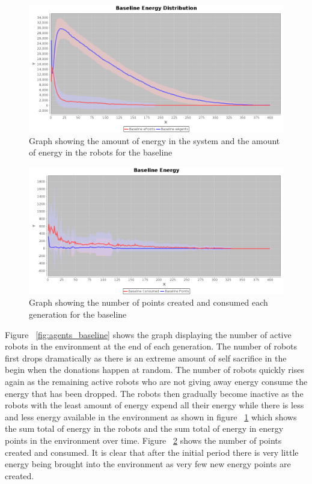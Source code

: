 \documentclass[a4paper]{book}
\begin{document}
\begin{figure}
\includegraphics[width=\textwidth]{expr2/baseline_distribution.png}
    \caption{Graph showing the amount of energy in the system and the amount of energy in the robots for the baseline}
\label{fig:distribution_baseline}
\end{figure}

\begin{figure}
	\includegraphics[width=\textwidth]{expr2/baseline_energy.png}
    \caption{Graph showing the number of points created and consumed each generation for the baseline}
    \label{fig:points_baseline}
\end{figure}



Figure ~\ref{fig:agents_baseline} shows the graph displaying the number of active robots in the environment at the end of each generation.
The number of robots first drops dramatically as there is an extreme amount of self sacrifice in the begin when the donations happen at random.
The number of robots quickly rises again as the remaining active robots who are not giving away energy consume the energy that has been dropped.
The robots then gradually become inactive as the robots with the least amount of energy expend all their energy while there is less and less energy 
available in the environment as shown in figure ~\ref{fig:distribution_baseline} which shows the sum total of energy in the robots and the sum total of energy in energy points in the environment over time.
Figure ~\ref{fig:points_baseline} shows the number of points created and consumed. It is clear that after the initial period there is very little energy being brought into the environment as very few new energy points are created. 
\end{document}
